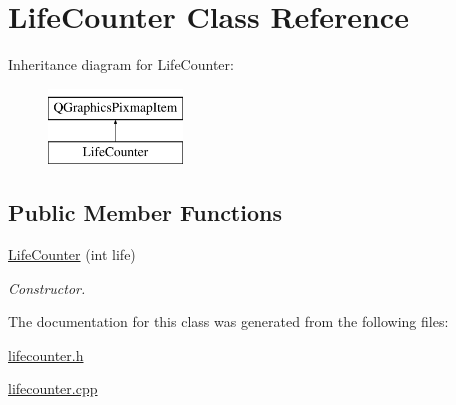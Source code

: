 \hypertarget{classLifeCounter}{\section{Life\-Counter Class Reference}
\label{classLifeCounter}
}
Inheritance diagram for Life\-Counter\-:\begin{figure}[H]
\begin{center}
\leavevmode
\includegraphics[height=2.000000cm]{classLifeCounter}
\end{center}
\end{figure}
\subsection*{Public Member Functions}
\begin{DoxyCompactItemize}
\item 
\hypertarget{classLifeCounter_a855f3024526e01622a4e2cdc7700b1ff}{\hyperlink{classLifeCounter_a855f3024526e01622a4e2cdc7700b1ff}{Life\-Counter} (int life)}\label{classLifeCounter_a855f3024526e01622a4e2cdc7700b1ff}

\begin{DoxyCompactList}\small\item\em Constructor. \end{DoxyCompactList}\end{DoxyCompactItemize}


The documentation for this class was generated from the following files\-:\begin{DoxyCompactItemize}
\item 
\hyperlink{lifecounter_8h}{lifecounter.\-h}\item 
\hyperlink{lifecounter_8cpp}{lifecounter.\-cpp}\end{DoxyCompactItemize}
